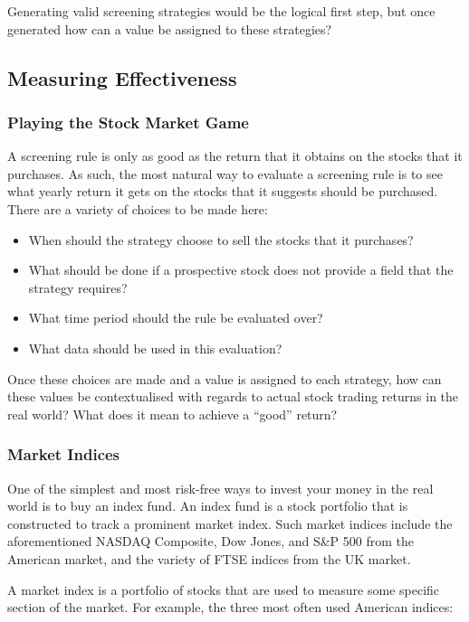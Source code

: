 Generating valid screening strategies would be the logical first step, but once generated how can a value be assigned to these strategies?

\subsection{Measuring Effectiveness}
\subsubsection{Playing the Stock Market Game}
A screening rule is only as good as the return that it obtains on the stocks that it purchases. As such, the most natural way to evaluate a screening rule is to see what yearly return it gets on the stocks that it suggests should be purchased. There are a variety of choices to be made here:
\begin{itemize}
    \item When should the strategy choose to sell the stocks that it purchases?
    \vspace{-2mm}
    \item What should be done if a prospective stock does not provide a field that the strategy requires?
    \vspace{-2mm}
    \item What time period should the rule be evaluated over?
    \vspace{-2mm}
    \item What data should be used in this evaluation?
\end{itemize}

Once these choices are made and a value is assigned to each strategy, how can these values be contextualised with regards to actual stock trading returns in the real world? What does it mean to achieve a ``good'' return?

\subsubsection{Market Indices} \label{snpPls}
One of the simplest and most risk-free ways to invest your money in the real world is to buy an index fund. An index fund is a stock portfolio that is constructed to track a prominent market index. Such market indices include the aforementioned NASDAQ Composite, Dow Jones, and S\&P 500 from the American market, and the variety of FTSE indices from the UK market. \newline

A market index is a portfolio of stocks that are used to measure some specific section of the market. For example, the three most often used American indices: 

